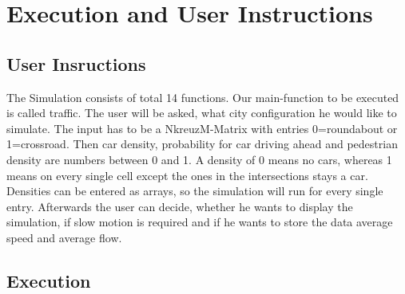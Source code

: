 \section{Execution and User Instructions}
\subsection{User Insructions}
The Simulation consists of total 14 functions. Our main-function to be executed is called traffic. The user will be asked, what city configuration he would like to simulate. The input has to be a NkreuzM-Matrix with entries 0=roundabout or 1=crossroad. Then car density, probability for car driving ahead and pedestrian density are numbers between 0 and 1. A density of 0 means no cars, whereas 1 means on every single cell except the ones in the intersections stays a car. Densities can be entered as arrays, so the simulation will run for every single entry. Afterwards the user can decide, whether he wants to display the simulation, if slow motion is required and if he wants to store the data average speed and average flow. \\
\subsection{Execution}
